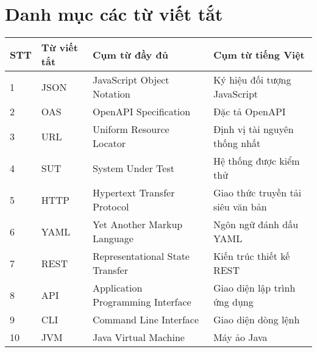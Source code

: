 \chapter*{Danh mục các từ viết tắt}
 
\begin{table}[h]
\begin{tabularx}{\textwidth}{|l|l|X|X|}
\hline
\textbf{STT} & \textbf{Từ viết tắt} & \textbf{Cụm từ đầy đủ} & \textbf{Cụm từ tiếng Việt} \\
\hline
1 & JSON & JavaScript Object Notation & Ký hiệu đối tượng JavaScript \\
\hline
2 & OAS & OpenAPI Specification & Đặc tả OpenAPI \\
\hline
3 & URL & Uniform Resource Locator  & Định vị tài nguyên thống nhất \\
\hline
4 & SUT & System Under Test  & Hệ thống được kiểm thử \\
\hline
5 & HTTP & Hypertext Transfer Protocol & Giao thức truyền tải siêu văn bản \\
\hline
6 & YAML & Yet Another Markup Language & Ngôn ngữ đánh dấu YAML \\
\hline
7 & REST & Representational State Transfer & Kiến trúc thiết kế REST \\
\hline
8 & API & Application Programming Interface & Giao diện lập
trình ứng dụng \\
\hline
9 & CLI & Command Line Interface & Giao diện dòng lệnh \\
\hline
10 & JVM & Java Virtual Machine & Máy ảo Java \\
\hline
\end{tabularx}
\end{table}